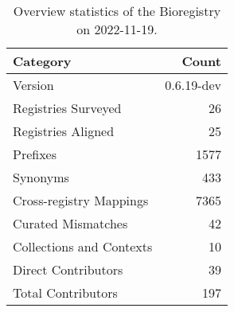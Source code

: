 \begin{table}
\centering
\caption{Overview statistics of the Bioregistry on 2022-11-19.}
\label{tab:bioregistry-summary}
\begin{tabular}{lr}
\toprule
                Category &      Count \\
\midrule
                 Version & 0.6.19-dev \\
     Registries Surveyed &         26 \\
      Registries Aligned &         25 \\
                Prefixes &       1577 \\
                Synonyms &        433 \\
 Cross-registry Mappings &       7365 \\
      Curated Mismatches &         42 \\
Collections and Contexts &         10 \\
     Direct Contributors &         39 \\
      Total Contributors &        197 \\
\bottomrule
\end{tabular}
\end{table}
